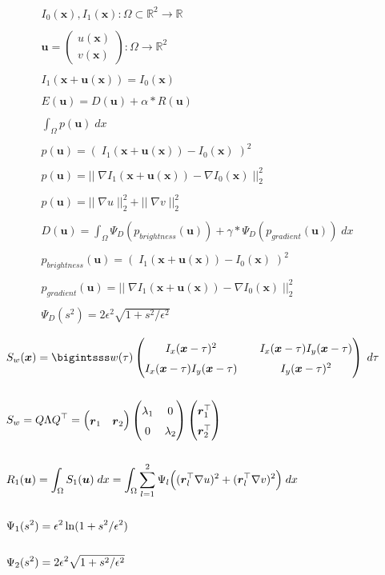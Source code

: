 \documentclass[11pt]{article}
\newcommand{\lam}{\lambda}
\newcommand{\mat}[1]{\begin{pmatrix} #1 \end{pmatrix}}
\newcommand{\Mat}[1]{\begingroup
\renewcommand*{\arraystretch}{1.5}
\mat{#1}
\endgroup}
\newcommand{\Real}{\mathbb{R}}
\newcommand{\flow}{\boldsymbol{u}}
\newcommand{\x}{\boldsymbol{x}}
\newcommand{\ev}{\boldsymbol{r}}
\newcommand{\T}{^\top}
\begin{document}
\begin{align*}
& I_0(\x),I_1(\x) : \Omega \subset \Real^2 \rightarrow \Real
\\\\
& \flow = \mat{u(\x)\\v(\x)} : \Omega \rightarrow \Real^2
\\\\
&I_1(\x+\flow(\x))=I_0(\x)
\\\\
&E(\flow)=D(\flow)+\alpha*R(\flow)
\\\\
&\int_\Omega p(\flow)\;dx
\\\\
&p(\flow) = (\;I_1(\x+\flow(\x))-I_0(\x)\;)^2
\\\\
&p(\flow) = ||\;\nabla I_1(\x+\flow(\x))-\nabla I_0(\x)\;||_2^2
\\\\
&p(\flow)= ||\;\nabla u\;||_2^2 + ||\;\nabla v\;||_2^2
\\\\
&D(\flow) = \int_\Omega \Psi_D(p_{brightness}(\flow)) + \gamma*\Psi_D(p_{gradient}(\flow))\;dx
\\\\
&p_{brightness}(\flow) = (\;I_1(\x+\flow(\x))-I_0(\x)\;)^2
\\\\
&p_{gradient}(\flow) = ||\;\nabla I_1(\x+\flow(\x))-\nabla I_0(\x)\;||_2^2
\\\\
&\Psi_D(s^2) = 2\epsilon^2\sqrt{1+s^2/\epsilon^2}
\end{align*}

\begin{align*}
&S_w(\x) = \bigintsss w(\tau)\Mat{I_x(\x-\tau)^2 && I_x(\x-\tau)I_y(\x-\tau)\\I_x(\x-\tau)I_y(\x-\tau) && I_y(\x-\tau)^2} \;d\tau
\\\\
&S_w = Q \Lambda Q\T = \mat{\ev_1&\ev_2}\mat{\lam_1&0\\0&\lam_2}\mat{\ev_1\T\\ \ev_2\T}
\\\\
&R_1(\flow)=\int_\Omega S_1(\flow)\;dx = \int_\Omega \sum_{l=1}^2 \Psi_l\Big((\ev_l\T\nabla u)^2+(\ev_l\T\nabla v)^2\Big)\;dx
\\\\
&\Psi_1(s^2) = \epsilon^2\ln(1+s^2/\epsilon^2)
\\\\
&\Psi_2(s^2) = 2\epsilon^2\sqrt{1+s^2/\epsilon^2}
\end{align*}
\end{document}
